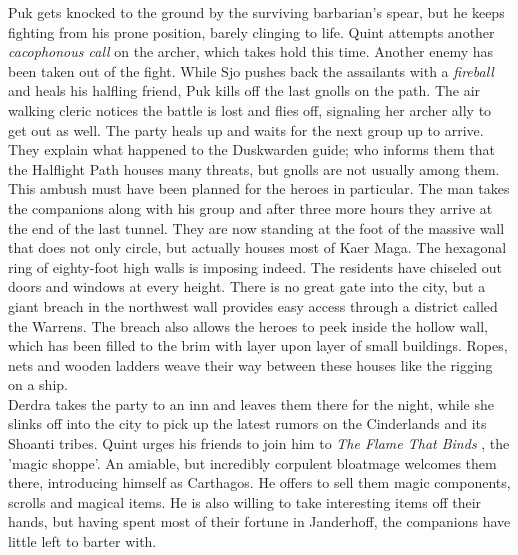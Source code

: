 Puk gets knocked to the ground by the surviving barbarian's spear, but he keeps fighting from his prone position, barely clinging to life. Quint attempts another  {\itshape cacophonous call} on the archer, which  takes hold this time. Another enemy has been taken out of the fight. While Sjo pushes back the assailants with  a  {\itshape fireball} and heals his halfling friend, Puk kills off the last gnolls on the path. The air walking cleric notices the battle is lost and flies off, signaling her archer ally to get out as well. The party heals up and waits for the next group up to arrive. They explain what happened to the Duskwarden guide; who informs them that the Halflight Path houses many threats, but gnolls are not usually among them. This ambush must have been planned for the heroes in particular. The man takes the companions along with his group and after three more hours they arrive at the end of the last tunnel. They are now standing at the foot of the massive wall that does not only circle, but actually houses most of Kaer Maga. The hexagonal ring of eighty-foot high walls is imposing indeed. The residents have chiseled out doors and windows  at every height. There is no great gate into the city, but a giant breach in the northwest wall provides easy access through a district called the Warrens. The breach also allows the heroes to peek inside the hollow wall, which has been filled to the brim with layer upon layer of small buildings. Ropes, nets and wooden ladders weave their way between these houses like the rigging on a ship.\\

Derdra takes the party to an inn and leaves them there for the night, while she slinks off into the city to pick up the latest rumors on the Cinderlands and its Shoanti tribes. Quint urges his friends to join him to {\itshape The Flame That Binds} , the 'magic shoppe'. An amiable, but incredibly corpulent bloatmage welcomes them there, introducing himself as Carthagos. He offers to sell them magic components, scrolls and magical items. He is also willing to take interesting items off their hands, but having spent most of their fortune in Janderhoff, the companions have little left to barter with. 
